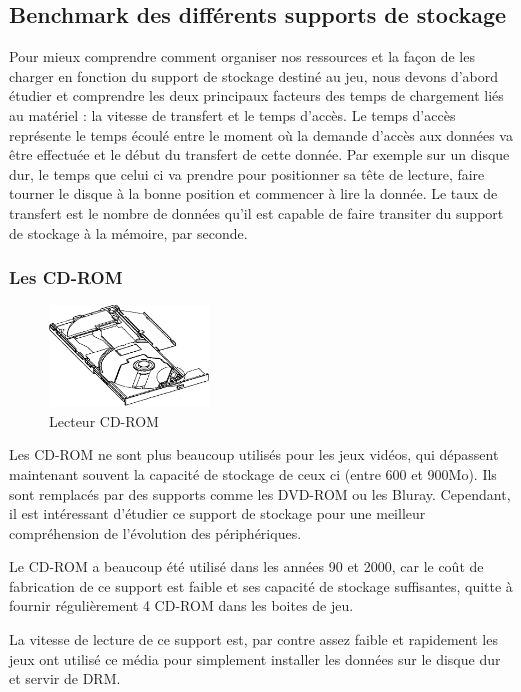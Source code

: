 \documentclass[a4paper, 12pt]{article} %
\begin{document}
\subsection{Benchmark des différents supports de stockage}
Pour mieux comprendre comment organiser nos ressources et la façon de les charger en fonction du support de stockage destiné au jeu, nous devons d'abord étudier et comprendre les deux principaux facteurs des temps de chargement liés au matériel : la vitesse de transfert et le temps d'accès. Le temps d'accès représente le temps écoulé entre le moment où la demande d'accès aux données va être effectuée et le début du transfert de cette donnée. Par exemple sur un disque dur, le temps que celui ci va prendre pour positionner sa tête de lecture, faire tourner le disque à la bonne position et commencer à lire la donnée. Le taux de transfert est le nombre de données qu'il est capable de faire transiter du support de stockage à la mémoire, par seconde.

\subsubsection{Les CD-ROM}
\begin{figure}
\begin{center}
\includegraphics[width=0.38\textwidth]{images/cdrom.png}
\end{center}
\caption{Lecteur CD-ROM}
\end{figure}
Les CD-ROM ne sont plus beaucoup utilisés pour les jeux vidéos, qui dépassent maintenant souvent la capacité de stockage de ceux ci (entre 600 et 900Mo). Ils sont remplacés par des supports comme les DVD-ROM ou les Bluray. Cependant, il est intéressant d'étudier ce support de stockage pour une meilleur compréhension de l'évolution des périphériques.

Le CD-ROM a beaucoup été utilisé dans les années 90 et 2000, car le coût de fabrication de ce support est faible et ses capacité de stockage suffisantes, quitte à fournir régulièrement 4 CD-ROM dans les boites de jeu.

La vitesse de lecture de ce support est, par contre assez faible et rapidement les jeux ont utilisé ce média pour simplement installer les données sur le disque dur et servir de DRM.
\end{document}
